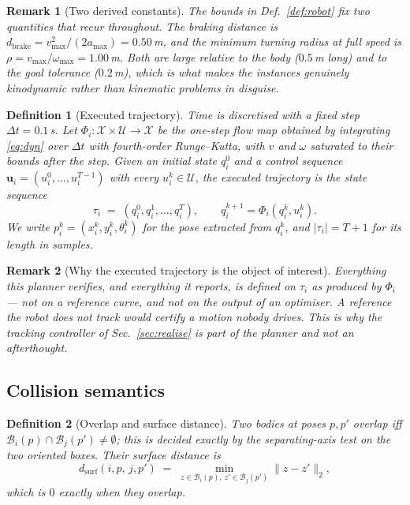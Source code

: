 \documentclass[conference]{IEEEtran}
\newtheorem{definition}{Definition}
\newtheorem{remark}{Remark}
\newcommand{\Bod}{\mathcal{B}}
\newcommand{\X}{\mathcal{X}}
\newcommand{\Uc}{\mathcal{U}}
\begin{document}
\begin{remark}[Two derived constants]
The bounds in Def.~\ref{def:robot} fix two quantities that recur throughout. The
\emph{braking distance} is
$d_{\text{brake}} = v_{\max}^2/(2a_{\max}) = 0.50$\,m, and the \emph{minimum turning
radius} at full speed is $\rho = v_{\max}/\omega_{\max} = 1.00$\,m. Both are large relative
to the body ($0.5$\,m long) and to the goal tolerance ($0.2$\,m), which is what makes the
instances genuinely kinodynamic rather than kinematic problems in disguise.
\end{remark}

\begin{definition}[Executed trajectory]
\label{def:exec}
Time is discretised with a fixed step $\Delta t = 0.1$\,s. Let
$\Phi_i : \X \times \Uc \to \X$ be the one-step flow map obtained by integrating
\eqref{eq:dyn} over $\Delta t$ with fourth-order Runge--Kutta, with $v$ and $\omega$
saturated to their bounds after the step. Given an initial state $q_i^0$ and a control
sequence $\mathbf{u}_i = (u_i^0,\dots,u_i^{T-1})$ with every $u_i^k \in \Uc$, the
\emph{executed trajectory} is the state sequence
\[
  \tau_i \;=\; (q_i^0, q_i^1, \dots, q_i^T),
  \qquad q_i^{k+1} = \Phi_i(q_i^k, u_i^k).
\]
We write $p_i^k = (x_i^k, y_i^k, \theta_i^k)$ for the pose extracted from $q_i^k$, and
$|\tau_i| = T+1$ for its length in samples.
\end{definition}

\begin{remark}[Why the executed trajectory is the object of interest]
Everything this planner verifies, and everything it reports, is defined on $\tau_i$ as
produced by $\Phi_i$ --- not on a reference curve, and not on the output of an optimiser.
A reference the robot does not track would certify a motion nobody drives. This is why
the tracking controller of Sec.~\ref{sec:realise} is part of the \emph{planner} and not an
afterthought.
\end{remark}

\subsection{Collision semantics}
\label{sec:prelim-collision}

\begin{definition}[Overlap and surface distance]
Two bodies at poses $p, p'$ \emph{overlap} iff
$\Bod_i(p) \cap \Bod_j(p') \neq \emptyset$; this is decided exactly by the separating-axis
test on the two oriented boxes. Their \emph{surface distance} is
\[
  d_{\text{surf}}(i,p,\,j,p') \;=\;
  \min_{z \in \Bod_i(p),\, z' \in \Bod_j(p')} \lVert z - z' \rVert_2 ,
\]
which is $0$ exactly when they overlap.
\end{definition}
\end{document}
